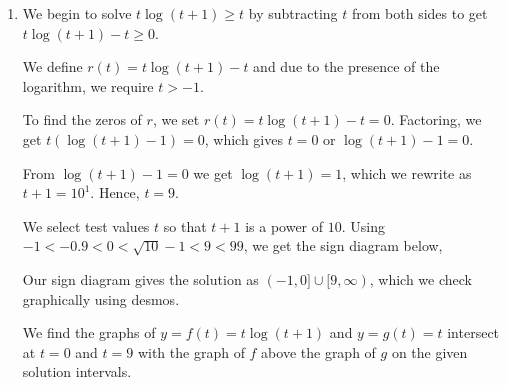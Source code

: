 \documentclass{ximera}
\begin{document}
\begin{example}
\begin{explanation}
\begin{enumerate}
From our sign diagram, we see $r(x)< 0$, which corresponds to our solution,  on $\left(\frac{1}{2}, 8 \right)$. 


 < 

Using desmos, we graph  $f(x)= \left(\log_{2}(x)\right)^2$ and $g(x) = 2 \log_{2}(x) + 3$.  We find the graph of $f$ is below the graph of $g$ on $\left(\frac{1}{2}, 8 \right)$.



\begin{center}
\end{center}


\item  We begin to solve $t \log(t+1) \geq t$ by subtracting $t$ from both sides to get $t \log(t+1)  - t \geq 0$.  

We define $r(t) = t \log(t+1)  - t $ and due to the presence of the logarithm, we require $t > -1$.  

To find the zeros of $r$, we set $r(t) = t \log(t+1)  - t = 0$.  Factoring, we get $t \left(\log(t+1) - 1\right) = 0$, which gives $t=0$ or $\log(t+1) - 1=0$.  

From $\log(t+1) - 1=0$ we get   $\log(t+1) = 1$, which we  rewrite as  $t+1 = 10^{1}$. Hence,   $t = 9$.  


We select test values $t$ so that $t+1$ is a power of $10$. Using $-1 < -0.9 < 0 < \sqrt{10} -1 < 9 < 99$, we get the sign diagram below,

\begin{image}
% 
\end{image}

Our sign diagram gives the solution as $(-1,0] \cup [9, \infty)$, which we check graphically using desmos.  

We find the graphs of  $y= f(t) = t \log(t+1)$  and $y=g(t) = t$ intersect at $t=0$ and $t=9$ with the graph of $f$ above the graph of $g$ on the given solution intervals.

\begin{center}
\end{center}

\end{enumerate}
\end{explanation}
\end{example}
\end{document}
